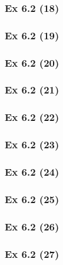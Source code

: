 \subsubsection{Ex 6.2 (18)}\label{sec:Ex_6.2.18}

\subsubsection{Ex 6.2 (19)}\label{sec:Ex_6.2.19}

\subsubsection{Ex 6.2 (20)}\label{sec:Ex_6.2.20}

\newpage		%

\subsubsection{Ex 6.2 (21)}\label{sec:Ex_6.2.21}

\subsubsection{Ex 6.2 (22)}\label{sec:Ex_6.2.22}

\subsubsection{Ex 6.2 (23)}\label{sec:Ex_6.2.23}

\subsubsection{Ex 6.2 (24)}\label{sec:Ex_6.2.24}

\subsubsection{Ex 6.2 (25)}\label{sec:Ex_6.2.25}

\subsubsection{Ex 6.2 (26)}\label{sec:Ex_6.2.26}

\subsubsection{Ex 6.2 (27)}\label{sec:Ex_6.2.27}

